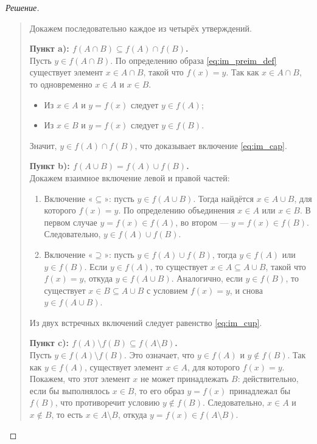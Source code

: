 \begin{proof}[Решение]~\\
    \begin{quote}
        Докажем последовательно каждое из четырёх утверждений.

        \textbf{Пункт a): $f(A \cap B) \subseteq f(A) \cap f(B)$.}\\
        Пусть $y \in f(A \cap B)$. По определению образа 
        \eqref{eq:im_preim_def} существует элемент $x \in A \cap B$, такой 
        что $f(x) = y$. Так как $x \in A \cap B$, то одновременно $x \in A$ 
        и $x \in B$.
        \begin{itemize}
            \item Из $x \in A$ и $y = f(x)$ следует $y \in f(A)$;
            \item Из $x \in B$ и $y = f(x)$ следует $y \in f(B)$.
        \end{itemize}
        Значит, $y \in f(A) \cap f(B)$, что доказывает включение 
        \eqref{eq:im_cap}.

        \textbf{Пункт b): $f(A \cup B) = f(A) \cup f(B)$.}\\
        Докажем взаимное включение левой и правой частей:
        \begin{enumerate}
            \item Включение «$\subseteq$»: пусть $y \in f(A \cup B)$. Тогда 
            найдётся $x \in A \cup B$, для которого $f(x) = y$. По 
            определению объединения $x \in A$ или $x \in B$. В первом 
            случае $y = f(x) \in f(A)$, во втором --- $y = f(x) \in f(B)$. 
            Следовательно, $y \in f(A) \cup f(B)$.
            \item Включение «$\supseteq$»: пусть $y \in f(A) \cup f(B)$, 
            тогда $y \in f(A)$ или $y \in f(B)$. Если $y \in f(A)$, то 
            существует $x \in A \subseteq A \cup B$, такой что $f(x) = y$, 
            откуда $y \in f(A \cup B)$. Аналогично, если $y \in f(B)$, то 
            существует $x \in B \subseteq A \cup B$ с условием $f(x) = y$, 
            и снова $y \in f(A \cup B)$.
        \end{enumerate}
        Из двух встречных включений следует равенство \eqref{eq:im_cup}.

        \textbf{Пункт c): $f(A) \setminus f(B) \subseteq f(A \setminus B)$.}\\
        Пусть $y \in f(A) \setminus f(B)$. Это означает, что $y \in f(A)$ и 
        $y \notin f(B)$. Так как $y \in f(A)$, существует элемент $x \in A$, 
        для которого $f(x) = y$. Покажем, что этот элемент $x$ не может 
        принадлежать $B$: действительно, если бы выполнялось $x \in B$, то 
        его образ $y = f(x)$ принадлежал бы $f(B)$, что противоречит 
        условию $y \notin f(B)$. Следовательно, $x \in A$ и $x \notin B$, 
        то есть $x \in A \setminus B$, откуда $y = f(x) \in f(A \setminus B)$.


\end{quote}
\end{proof}

